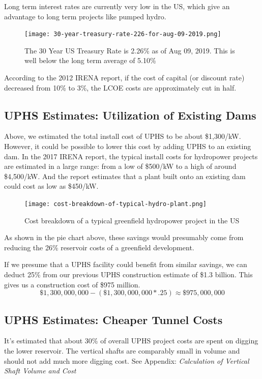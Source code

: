 \documentclass[hidelinks,12pt,a4paper]{article}
\begin{document}
Long term interest rates are currently very low in the US, which give an advantage to long term projects like pumped hydro.

\begin{figure}[ht!]
    \centering
    \texttt{[image: 30-year-treasury-rate-226-for-aug-09-2019.png]}
    \caption{The 30 Year US Treasury Rate is 2.26\% as of Aug 09, 2019. This is well below the long term average of 5.10\% \cite{30YearTreasuryRateUS}}
\end{figure}
\FloatBarrier

According to the 2012 IRENA report, if the cost of capital (or discount rate) decreased from 10\% to 3\%, the LCOE costs are approximately cut in half. \cite{RenewableEnergyTechnologiesCostAnalysisSeries}

\subsection{UPHS Estimates: Utilization of Existing Dams}
Above, we estimated the total install cost of UPHS to be about \$1,300/kW. However, it could be possible to lower this cost by adding UPHS to an existing dam. In the 2017 IRENA report, the typical install costs for hydropower projects are estimated in a large range: from a low of \$500/kW to a high of around \$4,500/kW. And the report estimates that a plant built onto an existing dam could cost as low as \$450/kW.

\begin{figure}[ht!]
    \centering
    \texttt{[image: cost-breakdown-of-typical-hydro-plant.png]}
    \caption{Cost breakdown of a typical greenfield hydropower project in the US \cite{RenewableEnergyTechnologiesCostAnalysisSeries}}
\end{figure}
\FloatBarrier

As shown in the pie chart above, these savings would presumably come from reducing the 26\% reservoir costs of a greenfield development.

If we presume that a UPHS facility could benefit from similar savings, we can deduct 25\% from our previous UPHS construction estimate of \$1.3 billion. This gives us a construction cost of \$975 million.
\[ \$1,300,000,000 - (\$1,300,000,000 * .25) \approx \$975,000,000\]

\subsection{UPHS Estimates: Cheaper Tunnel Costs}
It's estimated that about 30\% of overall UPHS project costs are spent on digging the lower reservoir. The vertical shafts are comparably small in volume and should not add much more digging cost. See Appendix: \textit{Calculation of Vertical Shaft Volume and Cost}
\end{document}
